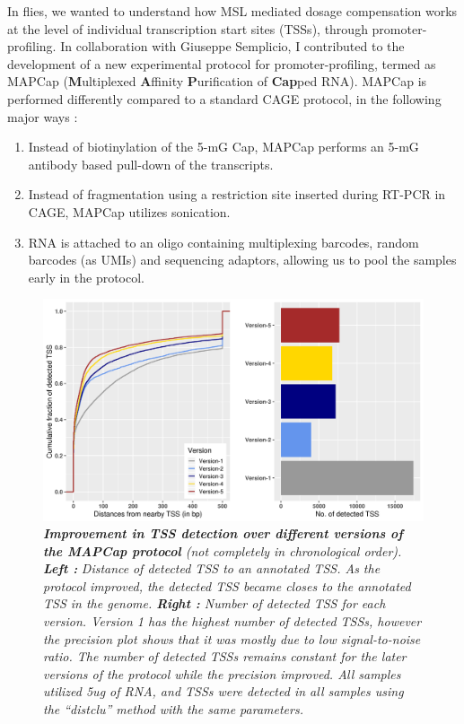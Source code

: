 \documentclass[11pt,twoside]{MPIthesis}
\theoremstyle{definition}
\theoremstyle{definition}
\theoremstyle{definition}
\theoremstyle{remark}
\begin{document}
In flies, we wanted to understand how MSL mediated dosage compensation
works at the level of individual transcription start sites (TSSs),
through promoter-profiling. In collaboration with Giuseppe Semplicio, I
contributed to the development of a new experimental protocol for
promoter-profiling, termed as MAPCap (\textbf{M}ultiplexed
\textbf{A}ffinity \textbf{P}urification of \textbf{Cap}ped RNA). MAPCap
is performed differently compared to a standard CAGE protocol, in the
following major ways :
\begin{enumerate}
\def\labelenumi{\arabic{enumi}.}
\item
  Instead of biotinylation of the 5-mG Cap, MAPCap performs an 5-mG
  antibody based pull-down of the transcripts.
\item
  Instead of fragmentation using a restriction site inserted during
  RT-PCR in CAGE, MAPCap utilizes sonication.
\item
  RNA is attached to an oligo containing multiplexing barcodes, random
  barcodes (as UMIs) and sequencing adaptors, allowing us to pool the
  samples early in the protocol.
\end{enumerate}
\begin{figure}

{\centering \includegraphics[width=0.9\linewidth]{figures/results_fig4} 

}

\caption[Improvement in TSS detection over different versions of the MAPCap protocol]{\emph{\textbf{Improvement in TSS detection over different
versions of the MAPCap protocol} (not completely in chronological
order). \textbf{Left :}} \emph{Distance} \emph{of detected TSS to an
annotated TSS. As the protocol improved, the detected TSS became closes
to the annotated TSS in the genome. \textbf{Right :} Number of detected
TSS for each version. Version 1 has the highest number of detected TSSs,
however the precision plot shows that it was mostly due to low
signal-to-noise ratio. The number of detected TSSs remains constant for
the later versions of the protocol while the precision improved. All
samples utilized 5ug of RNA, and TSSs were detected in all samples using
the ``distclu'' method with the same parameters. }}\label{fig:unnamed-chunk-9}
\end{figure}
\end{document}
